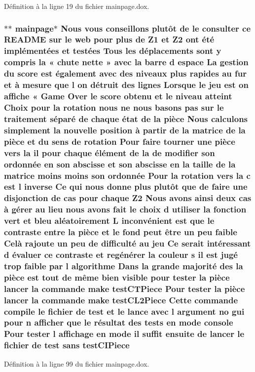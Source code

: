 Définition à la ligne 19 du fichier mainpage.\-dox.

\hypertarget{mainpage_8dox_ab4a43415d5813fd6e714ad4d6c99bdae}{
\subsubsection[{test\-C\-I\-Piece}]{\setlength{\rightskip}{0pt plus 5cm}$\ast$$\ast$ mainpage$\ast$ Nous vous conseillons plutô{\bf t} {\bf de} le consulter ce R\-E\-A\-D\-M\-E sur le web pour plus {\bf de} {\bf Z1} et Z2 ont é{\bf t}é implémentées et testées Tous les déplacements sont {\bf y} compris la « chute nette » avec la barre d espace La gestion du score est également avec des niveaux plus rapides au fur et à mesure que l on détruit des lignes Lorsque le jeu est on affiche « Game Over le score obtenu et le niveau atteint Choix pour la rotation nous ne nous basons pas sur le traitement {\bf s}éparé {\bf de} chaque état {\bf de} la pièce Nous calculons simplement la nouvelle position à partir {\bf de} la {\bf matrice} {\bf de} la pièce et du {\bf sens} {\bf de} rotation Pour faire tourner une pièce vers la il pour chaque élément {\bf de} la {\bf de} modifier son ordonnée en son abscisse et son abscisse en la taille {\bf de} la {\bf matrice} moins moins son ordonnée Pour la rotation vers la {\bf c} est l inverse Ce qui nous donne plus plutô{\bf t} que {\bf de} faire une disjonction {\bf de} {\bf cas} pour chaque Z2 Nous avons ainsi deux {\bf cas} à {\bf g}érer au lieu nous avons fait le choix d utiliser la fonction vert et bleu aléatoirement L inconvénient est que le contraste entre la pièce et le fond peut être un peu faible Celà rajoute un peu {\bf de} difficulté au jeu Ce serait intéressant d évaluer ce contraste et regé{\bf n}érer la couleur {\bf s} il est jugé trop faible par l algorithme Dans la grande majorité des la pièce est tout {\bf de} {\bf m}ême bien visible pour tester la pièce lancer la commande make test\-C\-T\-Piece Pour tester la pièce lancer la commande make test\-C\-L2\-Piece Cette commande compile le fichier {\bf de} test et le lance avec l argument no gui pour {\bf n} afficher que le {\bf r}ésultat des tests en {\bf mode} {\bf console} Pour tester l affichage en {\bf mode} il {\bf suffit} ensuite {\bf de} lancer le fichier {\bf de} test sans test\-C\-I\-Piece}}\label{mainpage_8dox_ab4a43415d5813fd6e714ad4d6c99bdae}


Définition à la ligne 99 du fichier mainpage.\-dox.

